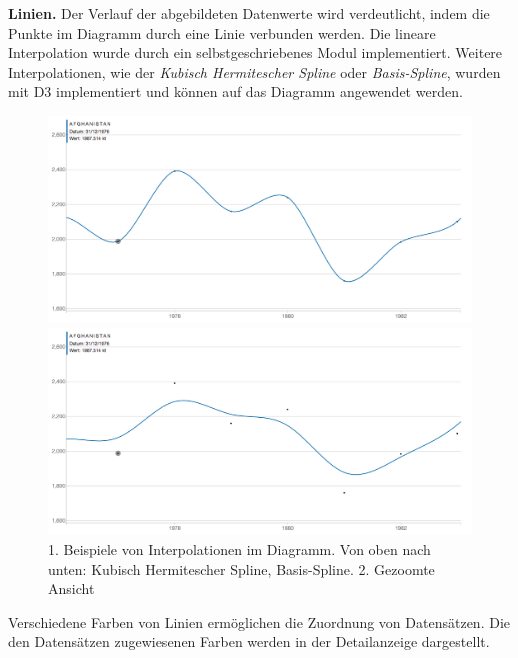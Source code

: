 \textbf{Linien.} Der Verlauf der abgebildeten Datenwerte wird verdeutlicht, indem die Punkte im Diagramm durch eine Linie verbunden werden. Die lineare Interpolation wurde durch ein selbstgeschriebenes Modul implementiert. Weitere Interpolationen, wie der \textit{Kubisch Hermitescher Spline} oder \textit{Basis-Spline}, wurden mit D3 implementiert und können auf das Diagramm angewendet werden.

\begin{figure}[!htbp]
	\begin{minipage}{\textwidth}
		\centering
		\includegraphics[width=\linewidth]{images/cardinal}
	\end{minipage}
	\begin{minipage}{\textwidth}
		\centering
		\includegraphics[width=\linewidth]{images/basis}
	\end{minipage}
	\caption[Beispiele von Interpolationen und Zoom]{1. Beispiele von Interpolationen im Diagramm. Von oben nach unten: Kubisch Hermitescher Spline, Basis-Spline. 2. Gezoomte Ansicht}
	\label{fig:vergleich}
\end{figure}

Verschiedene Farben von Linien ermöglichen die Zuordnung von Datensätzen. Die den Datensätzen zugewiesenen Farben werden in der Detailanzeige dargestellt.

